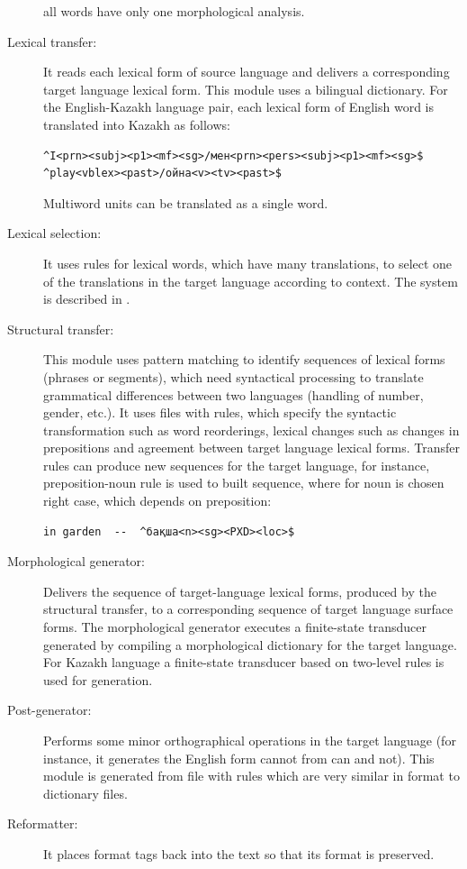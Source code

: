\documentclass[11pt]{article}
\begin{document}
\begin{description}
  all words have only one morphological analysis.
\item[Lexical transfer:] It reads each lexical form of source language and delivers a corresponding target language 
  lexical form. This module uses a bilingual dictionary. For the English-Kazakh language pair, each lexical form of 
  English word is translated into Kazakh as follows:
\begin{verbatim}
^I<prn><subj><p1><mf><sg>/мен<prn><pers><subj><p1><mf><sg>$ 
^play<vblex><past>/ойна<v><tv><past>$
\end{verbatim}
 Multiword units can be translated as a single word.
\item[ Lexical selection:] It uses rules for lexical words, which have many translations, to select one of the translations 
  in the target language according to context. The system is described in \cite{tyers12a}.
\item [Structural transfer:] This module uses pattern matching to identify sequences of lexical forms  (phrases or 
  segments), which need syntactical processing to translate grammatical differences between two languages (handling of 
  number, gender, etc.). It uses  files with rules, which specify  the syntactic transformation such as word reorderings, 
  lexical changes such as changes in prepositions and agreement between target language lexical forms. Transfer rules can 
  produce new sequences for the  target language, for instance, preposition-noun rule is used to built sequence, where for 
  noun is chosen right case, which depends on preposition: 
\begin{verbatim}
in garden  --  ^бақша<n><sg><PXD><loc>$
 \end{verbatim} 
\item[Morphological generator:] Delivers the sequence of target-language lexical forms, produced by the structural transfer, 
  to a corresponding sequence of target language surface forms. The morphological generator executes a finite-state transducer 
  generated by compiling a morphological dictionary for the target language.     
  For Kazakh language a finite-state transducer based on two-level rules \citep{washingtonsalimzyantyers14} is used for generation. 
\item[ Post-generator:] Performs some minor orthographical operations in the target language (for instance, it generates the 
  English form cannot from can and not). This module is generated from file with rules which are very   similar in format to dictionary files. 
\item[ Reformatter:] It places format tags back into the text so that its format is preserved.
\end{description}
\end{document}
